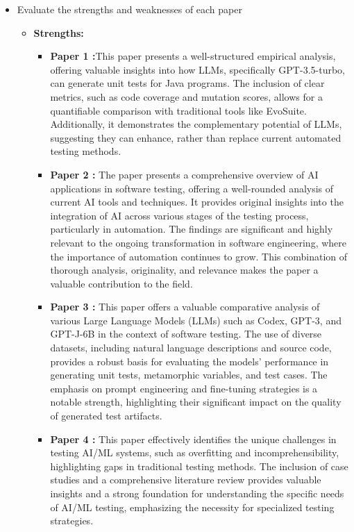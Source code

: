 \documentclass[12pt,a4paper]{article}
\begin{document}
\begin{itemize}
    \item Evaluate the strengths and weaknesses of each paper
    \begin{itemize}
        \item \textbf{Strengths:} 
        \begin{itemize}
            \item \textbf{Paper 1 :}This paper presents a well-structured empirical analysis, offering valuable insights into how LLMs, specifically GPT-3.5-turbo, can generate unit tests for Java programs. The inclusion of clear metrics, such as code coverage and mutation scores, allows for a quantifiable comparison with traditional tools like EvoSuite. Additionally, it demonstrates the complementary potential of LLMs, suggesting they can enhance, rather than replace current automated testing methods.

            \item \textbf{Paper 2 :} The paper presents a comprehensive overview of AI applications in software testing, offering a well-rounded analysis of current AI tools and techniques. It provides original insights into the integration of AI across various stages of the testing process, particularly in automation. The findings are significant and highly relevant to the ongoing transformation in software engineering, where the importance of automation continues to grow. This combination of thorough analysis, originality, and relevance makes the paper a valuable contribution to the field.

            \item \textbf{Paper 3 :} This paper offers a valuable comparative analysis of various Large Language Models (LLMs) such as Codex, GPT-3, and GPT-J-6B in the context of software testing. The use of diverse datasets, including natural language descriptions and source code, provides a robust basis for evaluating the models’ performance in generating unit tests, metamorphic variables, and test cases. The emphasis on prompt engineering and fine-tuning strategies is a notable strength, highlighting their significant impact on the quality of generated test artifacts.

            \item \textbf{Paper 4 :}  This paper effectively identifies the unique challenges in testing AI/ML systems, such as overfitting and incomprehensibility, highlighting gaps in traditional testing methods. The inclusion of case studies and a comprehensive literature review provides valuable insights and a strong foundation for understanding the specific needs of AI/ML testing, emphasizing the necessity for specialized testing strategies.


\end{itemize}
\end{itemize}
\end{itemize}
\end{document}
